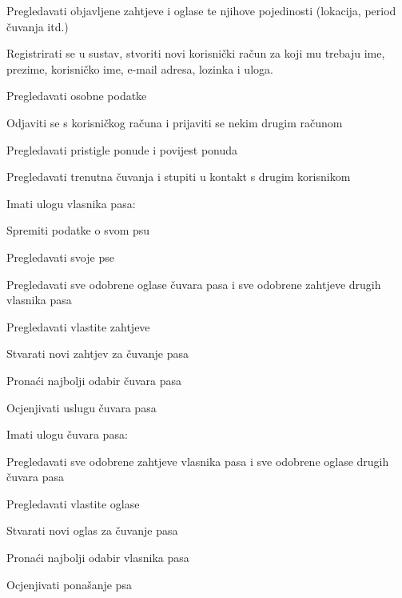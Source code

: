 			
			\begin{packed_enum}
				\item  {}
				
				\begin{packed_enum}
					
					\item Pregledavati objavljene zahtjeve i oglase te njihove pojedinosti (lokacija, period čuvanja itd.)
					\item Registrirati se u sustav, stvoriti novi korisnički račun za koji mu trebaju ime, prezime, korisničko ime, e-mail adresa, lozinka i uloga.
				\end{packed_enum}
				
				\item  {}
				
				\begin{packed_enum}
					
					\item Pregledavati osobne podatke
					\item Odjaviti se s korisničkog računa i prijaviti se nekim drugim računom
					\item Pregledavati pristigle ponude i povijest ponuda
					\item Pregledavati trenutna čuvanja i stupiti u kontakt s drugim korisnikom
					\item Imati ulogu vlasnika pasa:
					\begin{packed_enum}
						\item Spremiti podatke o svom psu
						\item Pregledavati svoje pse
						\item Pregledavati sve odobrene oglase čuvara pasa i sve odobrene zahtjeve drugih vlasnika pasa
						\item Pregledavati vlastite zahtjeve
						\item Stvarati novi zahtjev za čuvanje pasa
						\item Pronaći najbolji odabir čuvara pasa
						\item Ocjenjivati uslugu čuvara pasa
					\end{packed_enum}
					\item Imati ulogu čuvara pasa:
					\begin{packed_enum}
						\item Pregledavati sve odobrene zahtjeve vlasnika pasa i sve odobrene oglase drugih čuvara pasa
						\item Pregledavati vlastite oglase
						\item Stvarati novi oglas za čuvanje pasa
						\item Pronaći najbolji odabir vlasnika pasa
						\item Ocjenjivati ponašanje psa
						

\end{packed_enum}
\end{packed_enum}
\end{packed_enum}
